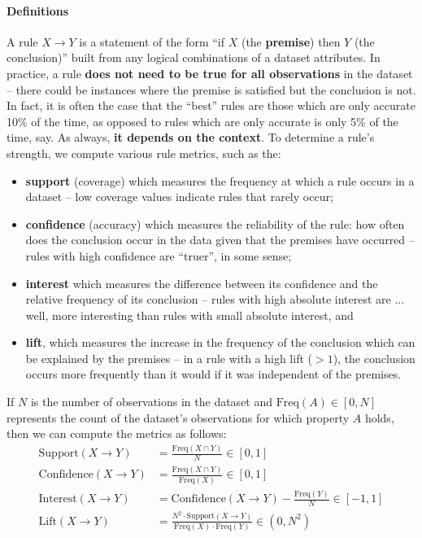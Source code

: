 \paragraph{Definitions} A rule $X\to Y$ is a statement of the form ``if $X$ (the \textbf{premise}) then $Y$ (the conclusion)'' built from any logical combinations of a dataset attributes. In practice, a rule \textbf{does not need to be true for all observations} in the dataset -- there could be instances where the premise is satisfied but the conclusion is not. In fact, it is often the case that the ``best'' rules are those which are only accurate 10\% of the time, as opposed to rules which are only accurate is only 5\% of the time, say. As always, \textbf{it depends on the context}.\newl 
To determine a rule's strength, we compute various rule metrics, such as the:
\begin{itemize}[noitemsep]
\item \textbf{support} (coverage) which measures the frequency at which a rule occurs in a dataset -- low coverage values indicate rules that rarely occur;
\item \textbf{confidence} (accuracy) which measures the reliability of the rule: how often does the conclusion occur in the data given that the premises have occurred --  rules with high confidence are ``truer'', in some sense;
\item \textbf{interest} which  measures the difference between its confidence and the relative frequency of its conclusion -- rules with high absolute interest are ... well, more interesting than rules with small absolute interest, and  
\item \textbf{lift}, which measures the increase in the frequency of the conclusion which can be explained by the premises -- in a rule with a high lift ($>1$), the conclusion occurs more frequently than it would if it was independent of the premises.
\end{itemize}
If $N$ is the number of observations in the dataset and $\textrm{Freq}(A)\in [0,N]$ represents the count of the dataset's observations for which property $A$ holds, then we can compute the metrics as follows: 
\begin{align*}
    \textrm{Support}(X\to Y)&=\frac{\textrm{Freq}(X\cap Y)}{N}\in[0,1] \\ 
    \textrm{Confidence}(X\to Y)&=\frac{\textrm{Freq}(X\cap Y)}{\textrm{Freq}(X)}\in[0,1] \\ 
    \textrm{Interest}(X\to Y)&=\textrm{Confidence}(X\to Y) - \frac{\textrm{Freq}(Y)}{N} \in [-1,1] \\ 
\textrm{Lift}(X\to Y) &=\frac{N^2\cdot \textrm{Support}(X\to Y)}{\textrm{Freq}(X)\cdot \textrm{Freq}(Y)} \in (0,N^2)
\end{align*}
